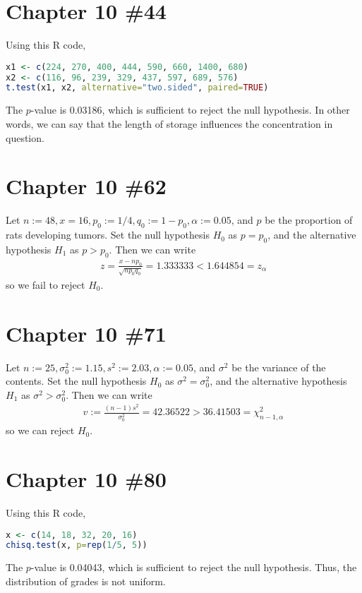 \documentclass{scrartcl}
\begin{document}
\section{Chapter 10 \#44}
Using this R code,
\begin{lstlisting}[language=R]
x1 <- c(224, 270, 400, 444, 590, 660, 1400, 680)
x2 <- c(116, 96, 239, 329, 437, 597, 689, 576)
t.test(x1, x2, alternative="two.sided", paired=TRUE)
\end{lstlisting}
The \(p\)-value is 0.03186, which is sufficient to reject the null hypothesis.
In other words, we can say that the length of storage influences the
concentration in question.

\section{Chapter 10 \#62}
Let \(n := 48, x = 16, p_0 := 1/4, q_0 := 1 - p_0, \alpha := 0.05\), and \(p\)
be the proportion of rats developing tumors. Set the null hypothesis \(H_0\) as
\(p = p_0\), and the alternative hypothesis \(H_1\) as \(p > p_0\). Then we can
write
\begin{align*}
  z
  = \frac{x - np_0}{\sqrt{np_0 q_0}}
  = 1.333333
  < 1.644854
  = z_\alpha
\end{align*}
so we fail to reject \(H_0\).

\section{Chapter 10 \#71}
Let \(n := 25, \sigma^2_0 := 1.15, s^2 := 2.03, \alpha := 0.05\), and
\(\sigma^2\) be the variance of the contents. Set the null hypothesis \(H_0\)
as \(\sigma^2 = \sigma^2_0\), and the alternative hypothesis \(H_1\) as
\(\sigma^2 > \sigma^2_0\). Then we can write
\begin{align*}
  v
  := \frac{(n - 1) s^2}{\sigma^2_0}
  = 42.36522
  > 36.41503
  = \chi^2_{n - 1, \alpha}
\end{align*}
so we can reject \(H_0\).


\section{Chapter 10 \#80}
Using this R code,
\begin{lstlisting}[language=R]
x <- c(14, 18, 32, 20, 16)
chisq.test(x, p=rep(1/5, 5))
\end{lstlisting}
The \(p\)-value is 0.04043, which is sufficient to reject the null hypothesis.
Thus, the distribution of grades is not uniform.
\end{document}

